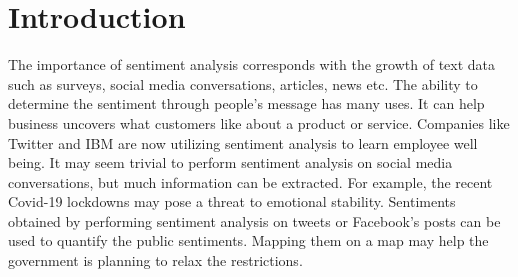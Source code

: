 \section{Introduction}
The importance of sentiment analysis corresponds with the growth of text data such as surveys, social media conversations, articles, news etc. The ability to determine the sentiment through people's message has many uses. It can help business uncovers what customers like about a product or service. Companies like Twitter and IBM are now utilizing sentiment analysis to learn employee well being. It may seem trivial to perform sentiment analysis on social media conversations, but much information can be extracted. For example, the recent Covid-19 lockdowns may pose a threat to emotional stability. Sentiments obtained by performing sentiment analysis on tweets or Facebook's posts can be used to quantify the public sentiments. Mapping them on a map may help the government is planning to relax the restrictions.  